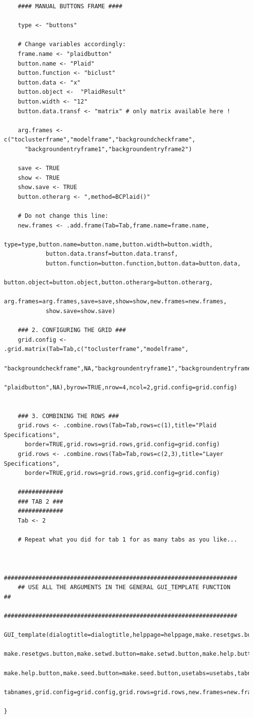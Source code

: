 \documentclass[a4paper]{article}\usepackage[]{graphicx}\usepackage[]{color}
\begin{document}
\begin{verbatim}
	#### MANUAL BUTTONS FRAME ####

	type <- "buttons"
	
	# Change variables accordingly:
	frame.name <- "plaidbutton"  
	button.name <- "Plaid"  
	button.function <- "biclust" 
	button.data <- "x" 
	button.object <-  "PlaidResult" 
	button.width <- "12"
	button.data.transf <- "matrix" # only matrix available here !
	
	arg.frames <- c("toclusterframe","modelframe","backgroundcheckframe",
      "backgroundentryframe1","backgroundentryframe2")
	
	save <- TRUE 
	show <- TRUE
	show.save <- TRUE
	button.otherarg <- ",method=BCPlaid()" 
	
	# Do not change this line: 
	new.frames <- .add.frame(Tab=Tab,frame.name=frame.name,
			type=type,button.name=button.name,button.width=button.width,
			button.data.transf=button.data.transf,
			button.function=button.function,button.data=button.data,
			button.object=button.object,button.otherarg=button.otherarg,
			arg.frames=arg.frames,save=save,show=show,new.frames=new.frames,
            show.save=show.save)
	
	### 2. CONFIGURING THE GRID ###
	grid.config <- .grid.matrix(Tab=Tab,c("toclusterframe","modelframe",
       "backgroundcheckframe",NA,"backgroundentryframe1","backgroundentryframe2",
       "plaidbutton",NA),byrow=TRUE,nrow=4,ncol=2,grid.config=grid.config)
	
	
	### 3. COMBINING THE ROWS ###
	grid.rows <- .combine.rows(Tab=Tab,rows=c(1),title="Plaid Specifications",
      border=TRUE,grid.rows=grid.rows,grid.config=grid.config)
	grid.rows <- .combine.rows(Tab=Tab,rows=c(2,3),title="Layer Specifications",
      border=TRUE,grid.rows=grid.rows,grid.config=grid.config)
	
	#############
	### TAB 2 ###
	#############
	Tab <- 2
	
	# Repeat what you did for tab 1 for as many tabs as you like...
	
	
	###################################################################
	## USE ALL THE ARGUMENTS IN THE GENERAL GUI_TEMPLATE FUNCTION    ##
	###################################################################
	GUI_template(dialogtitle=dialogtitle,helppage=helppage,make.resetgws.button=
      make.resetgws.button,make.setwd.button=make.setwd.button,make.help.button=
      make.help.button,make.seed.button=make.seed.button,usetabs=usetabs,tabnames=
      tabnames,grid.config=grid.config,grid.rows=grid.rows,new.frames=new.frames)
	
}
\end{verbatim}
\end{document}
